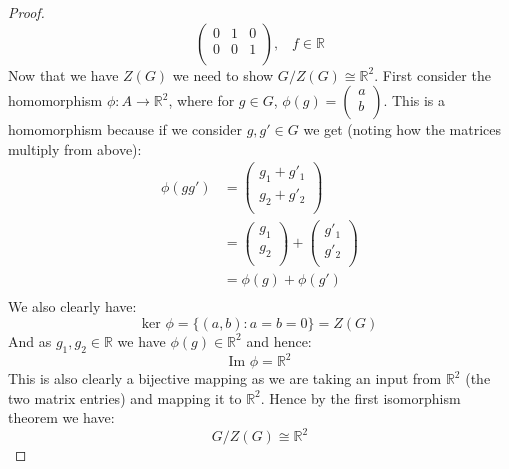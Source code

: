\documentclass{article}
\begin{document}
\begin{proof}
$$\begin{pmatrix}
0 & 1 & 0\\
0 & 0 & 1\\
\end{pmatrix}, \;\;\; f\in\mathbb{R}$$
Now that we have $Z(G)$ we need to show $G/Z(G)\cong\mathbb{R}^2$. First consider the homomorphism $\phi: A\rightarrow\mathbb{R}^2$, where for $g\in G$, $\phi(g)=\begin{pmatrix}
a\\
b\\
\end{pmatrix}$. This is a homomorphism because if we consider $g,g'\in G$ we get (noting how the matrices multiply from above):
\begin{align*}
\phi(gg')&=\begin{pmatrix}
g_1+g'_1\\
g_2+g'_2\\
\end{pmatrix}\\
&=\begin{pmatrix}
g_1\\
g_2\\
\end{pmatrix}+\begin{pmatrix}
g'_1\\
g'_2\\
\end{pmatrix}\\
&=\phi(g)+\phi(g')\\
\end{align*}
We also clearly have:
$$\text{ker }\phi=\{(a,b):a=b=0\}=Z(G)$$
And as $g_1,g_2\in\mathbb{R}$ we have $\phi(g)\in\mathbb{R}^2$ and hence:
$$\text{Im }\phi=\mathbb{R}^2$$
This is also clearly a bijective mapping as we are taking an input from $\mathbb{R}^2$ (the two matrix entries) and mapping it to $\mathbb{R}^2$. Hence by the first isomorphism theorem we have:
$$G/Z(G)\cong\mathbb{R}^2$$
\end{proof}
\end{document}
